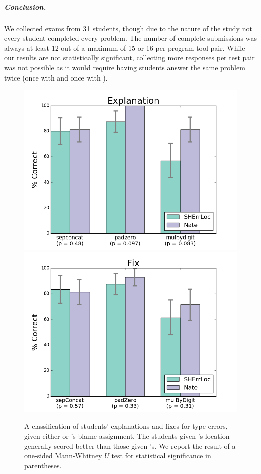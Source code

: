 \subparagraph{Conclusion.}
%
We collected exams from 31 students, though due to the nature of the
study not every student completed every problem.
%
The number of complete submissions was always at least 12 out of
a maximum of 15 or 16 per program-tool pair.
%
While our results are not statistically significant,
collecting more responses per test pair was not possible as it
would require having students answer the same problem twice (once with
\sherrloc and once with \toolname).

\begin{figure}[p]
\centering
\includegraphics[width=0.7\linewidth]{nate/user-study-reason.png}
\includegraphics[width=0.7\linewidth]{nate/user-study-fix.png}
\caption[A classification of students' explanations and fixes for type
  errors, given either \sherrloc or \toolname's blame assignment.]
  {A classification of students' explanations and fixes for type
  errors, given either \sherrloc or \toolname's blame assignment.
  The students given \toolname's location generally scored
  better than those given \sherrloc's.
  We report the result of a one-sided Mann-Whitney $U$ test for
  statistical significance in parentheses.}
\label{fig:nate:results-user-study}
\end{figure}


